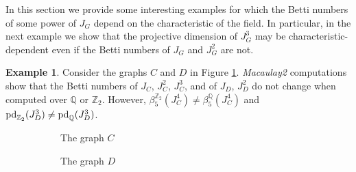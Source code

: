 \documentclass[11pt,oneside]{amsart}
\theoremstyle{plain}
\theoremstyle{definition}
\newtheorem{example}[theorem]{Example}
\newcommand{\pd}{{\rm pd}}
\begin{document}
In this section we provide some interesting examples for which the Betti numbers of some power of $J_G$ depend on the characteristic of the field. In particular, in the next example we show that the projective dimension of $J_G^3$ may be characteristic-dependent even if the Betti numbers of $J_G$ and $J_G^2$ are not.

\begin{example}
Consider the graphs $C$ and $D$ in Figure \ref{F.bei1}. \textit{Macaulay2} computations show that the Betti numbers of $J_{C}$, $J_{C}^2$, $J_{C}^3$, and of $J_{D}$, $J_{D}^2$ do not change when computed over $\mathbb{Q}$ or $\mathbb{Z}_2$. However, $\beta^{\mathbb{Z}_2}_5(J_{C}^4) \neq \beta^{\mathbb{Q}}_5(J_{C}^4)$ and $\pd_{\mathbb{Z}_2} (J_{D}^3) \neq \pd_{\mathbb{Q}} (J_{D}^3)$. 

\begin{figure}[ht!]
\begin{subfigure}[c]{0.45\textwidth}
\centering
{}
\caption{The graph $C$}
\end{subfigure}
\begin{subfigure}[c]{0.45\textwidth}
\centering
{}

\caption{The graph $D$}
\end{subfigure}
\vspace{-4mm}
\caption{} \label{F.bei1}
\end{figure}
\end{example}
\vspace{-5mm}
\end{document}
